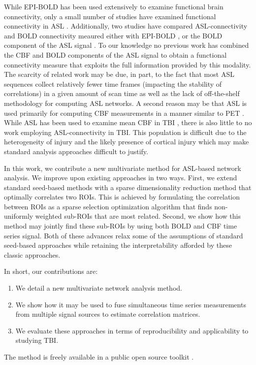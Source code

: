 \documentclass{llncs}
\begin{document}
While EPI-BOLD has been used extensively to examine functional brain connectivity, only a small number of studies have examined functional connectivity in ASL \cite{Chuang2008,Zou2009}. Additionally, two studies have compared ASL-connectivity and BOLD connectivity meaured either with EPI-BOLD \cite{Li2012}, or the BOLD component of the ASL signal \cite{Viviani2011}.  To our knowledge no previous work has combined the CBF and BOLD components of the ASL signal to obtain a functional connectivity measure that exploits the full information provided by this modality. The scarcity of related work may be due, in part, to the fact that most ASL sequences collect relatively fewer time frames (impacting the stability of correlations) in a given amount of scan time as well as the lack of off-the-shelf methodology for computing ASL networks.  A second reason may be that ASL is used primarily for computing CBF measurements in a manner similar to PET \cite{}.  While ASL has been used to examine mean CBF in TBI \cite{Hart2013}, there is also little to no work employing ASL-connectivity in TBI.   This population is difficult due to the heterogeneity of injury and the likely presence of cortical injury which may make standard analysis approaches difficult to justify. 

In this work, we contribute a new multivariate method for ASL-based network analysis.  We improve upon existing approaches in two ways.  First, we extend standard seed-based methods with a sparse dimensionality reduction method that optimally correlates two ROIs.  This is achieved by formulating the correlation between ROIs as a sparse selection optimization algorithm that finds non-uniformly weighted sub-ROIs that are most related.  Second, we show how this method may jointly find these sub-ROIs by using both BOLD and CBF time series signal.  Both of these advances relax some of the assumptions of standard seed-based approaches while retaining the interpretability afforded by these classic approaches.  

In short, our contributions are: 
\begin{enumerate}
\item We detail a new multivariate network analysis method.
\item We show how it may be used to fuse simultaneous time series measurements from multiple signal sources to estimate correlation matrices.
\item We evaluate these approaches in terms of reproducibility and applicability to studying TBI. 
\end{enumerate}
The method is freely available in a public open source toolkit \cite{}.
\end{document}
